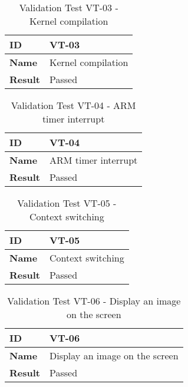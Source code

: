 \begin{table}[H]
    \centering
    \begin{tabular}{| p{3cm} | p{7cm} |}
    \hline
    \textbf{ID}             & VT-03 \\ \hline
    \textbf{Name}           & Kernel compilation \\ \hline
    \textbf{Result}         & \textcolor{mygreen}{Passed}\\ \hline
    \end{tabular}
    \caption{Validation Test VT-03 - Kernel compilation }
\end{table}

\begin{table}[H]
    \centering
    \begin{tabular}{| p{3cm} | p{7cm} |}
    \hline
    \textbf{ID}             & VT-04 \\ \hline
    \textbf{Name}           & ARM timer interrupt \\ \hline
    \textbf{Result}         & \textcolor{mygreen}{Passed}\\ \hline
    \end{tabular}
    \caption{Validation Test VT-04 - ARM timer interrupt }
\end{table}

\begin{table}[H]
    \centering
    \begin{tabular}{| p{3cm} | p{7cm} |}
    \hline
    \textbf{ID}             & VT-05 \\ \hline
    \textbf{Name}           & Context switching \\ \hline
    \textbf{Result}         & \textcolor{mygreen}{Passed}\\ \hline
    \end{tabular}
    \caption{Validation Test VT-05 - Context switching }
\end{table}

\begin{table}[H]
    \centering
    \begin{tabular}{| p{3cm} | p{7cm} |}
    \hline
    \textbf{ID}             & VT-06 \\ \hline
    \textbf{Name}           & Display an image on the screen\\ \hline
    \textbf{Result}         & \textcolor{mygreen}{Passed}\\ \hline
    \end{tabular}
    \caption{Validation Test VT-06 - Display an image on the screen}
\end{table}

